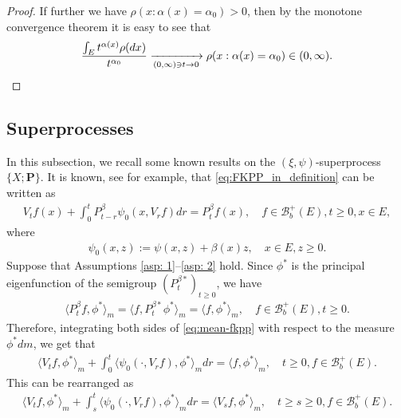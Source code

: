\documentclass[12pt,a4paper]{amsart}
\theoremstyle{definition}
\numberwithin{equation}{section}
\begin{document}
\begin{proof}
	If further we have $\rho(x:\alpha(x) = \alpha_0)>0$, then by the monotone convergence theorem  it is easy to see that
  \begin{equation}
    \frac{\int_E t^{\alpha(x)} \rho(dx)}{t^{\alpha_0}}
    \xrightarrow[(0,\infty)\ni t\to 0]{} \rho(x:\alpha(x) = \alpha_0)\in (0,\infty).
    \qedhere
  \end{equation}
\end{proof}

\subsection{Superprocesses} \label{sec: Superprocesses}
In this subsection, we recall some known results on the $(\xi, \psi)$-superprocess $\{X; \mathbf P\}$.
It is known, see \cite[Theorem 2.23]{Li2011Measure-valued} for example, that \eqref{eq:FKPP_in_definition} can be written as
\begin{align}\label{eq:mean-fkpp}
	V_t f(x) + \int_0^t P^\beta_{t-r} \psi_0(x,V_r f) dr
	= P^\beta_t f(x),
	\quad f \in \mathscr B^+_b(E), t \geq 0,x \in E,
\end{align}
where
\begin{align}
	\psi_0(x,z)
	:= \psi(x,z) + \beta(x)z,
	\quad x \in E,z \geq 0.
\end{align}
Suppose that Assumptions \ref{asp: 1}--\ref{asp: 2} hold.
Since $\phi^*$ is the principal eigenfunction of the semigroup $(P_t^{\beta*})_{t\geq 0}$, we have
\begin{align}
  \langle P^\beta_{t} f, \phi^* \rangle_m
  = \langle f, P^{\beta*}_{t}\phi^* \rangle_m
  = \langle f, \phi^* \rangle_m,
  \quad f\in \mathscr B^+_b(E), t\geq 0.
\end{align}
Therefore, integrating both sides of \eqref{eq:mean-fkpp} with respect to the measure 
$\phi^*dm$, we get that
\begin{align}
  \langle V_tf,\phi^*\rangle_m + \int_0^t \langle \psi_0(\cdot ,V_r f) , \phi^*\rangle_mdr
  = \langle f,\phi^*\rangle_m,
  \quad t\geq 0, f\in \mathscr B^+_b(E).
\end{align}
This can be rearranged as
\begin{align}\label{eq:langleVtfphiranglem_equation}
  \langle V_tf,\phi^*\rangle_m + \int_s^t \langle \psi_0(\cdot ,V_r f) , \phi^*\rangle_mdr
  = \langle V_sf,\phi^*\rangle_m,
  \quad t\geq s\geq 0, f\in \mathscr B^+_b(E).
\end{align}
\end{document}
